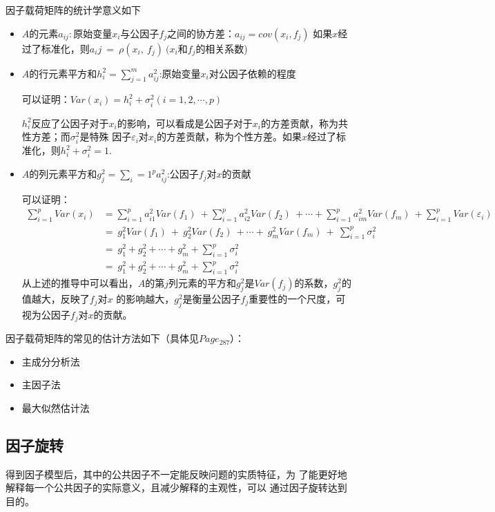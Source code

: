 \documentclass[12pt]{ctexart}
\numberwithin{equation}{section} %
\begin{document}
因子载荷矩阵的统计学意义如下

\begin{itemize}
  \item $A$的元素$a_{ij}:$原始变量$x_i$与公因子$f_j$之间的协方差：$a_{ij}=cov(x_i,f_j)$
  如果$x$经过了标准化，则$a_ij~=~\rho(x_i,~f_j)~(x_i$和$f_j$的相关系数)
\item $A$的行元素平方和$h_i^2=\sum_{j=1}^ma_{ij}^2$:原始变量$x_i$对公因子依赖的程度

可以证明：$Var\left(x_{i}\right)=h_{i}^{2}+\sigma_{i}^{2}\left(i=1,2,\cdots,p\right)$

$h_i^2$反应了公因子对于$x_i$的影响，可以看成是公因子对于$x_i$的方差贡献，称为共性方差；而$\sigma_i^2$是特殊
因子$\varepsilon_i$对$x_i$的方差贡献，称为个性方差。如果$x$经过了标准化，则$h_i^2+\sigma_i^2=1.$
\item $A$的列元素平方和$g_j^2=\sum_i=1^pa_{ij}^2$:公因子$f_j$对$x$的贡献

可以证明：
$$\begin{aligned}\sum_{i=1}^{p}Var\left(x_{i}\right)&=\sum_{i=1}^{p}a_{i1}^{2}Var\left(f_{1}\right)\:+\sum_{i=1}^{p}a_{i2}^{2}Var\left(f_{2}\right)\:+\cdots+\sum_{i=1}^{p}a_{im}^{2}Var\left(f_{m}\right)\:+\sum_{i=1}^{p}Var\left(\varepsilon_{i}\right)\\&=\:g_{1}^{2}Var\left(f_{1}\right)\:+\:g_{2}^{2}Var\left(f_{2}\right)\:+\cdots+\:g_{m}^{2}Var\left(f_{m}\right)\:+\:\sum_{i=1}^{p}\sigma_{i}^{2}\\&=\:g_{1}^{2}+g_{2}^{2}+\cdots+g_{m}^{2}+\sum_{i=1}^{p}\sigma_{i}^{2}\\&=\:g_{1}^{2}+g_{2}^{2}+\cdots+g_{m}^{2}+\sum_{i=1}^{p}\sigma_{i}^{2}\end{aligned}$$
从上述的推导中可以看出，$A$的第$j$列元素的平方和$g_j^2$是$Var\left(f_j\right)$的系数，$g_j^2$的值越大，反映了$f_j$对$x$
的影响越大，$g_j^2$是衡量公因子$f_j$重要性的一个尺度，可视为公因子$f_j$对$x$的贡献。
\end{itemize}

因子载荷矩阵的常见的估计方法如下（具体见\cite{司守奎}$Page_{287}$）：
\begin{itemize}
  \item 主成分分析法
  \item 主因子法
  \item 最大似然估计法
\end{itemize}
\subsection{因子旋转}
得到因子模型后，其中的公共因子不一定能反映问题的实质特征，为
了能更好地解释每一个公共因子的实际意义，且减少解释的主观性，可以
通过因子旋转达到目的。
\end{document}
